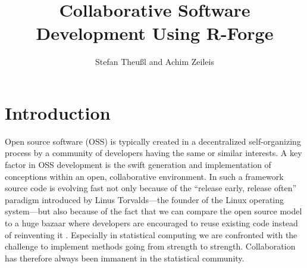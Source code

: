 \title{Collaborative Software Development Using R-Forge}
\author{Stefan Theu\ss{}l and Achim Zeileis}

\maketitle



\newcommand{\tab}[1]{{\normalfont\textit{#1}}}

\section*{Introduction}


Open source software (OSS) is typically created in a decentralized
self-organizing process by a community of developers having the same
or similar interests. A key factor in OSS development is the swift
generation and implementation of conceptions within an open,
collaborative environment. In such a framework source code is evolving
fast not only because of the ``release early, release often''
paradigm introduced by Linus Torvalds---the founder of the Linux
operating system---but also because of the fact that we can compare
the open source model 
to a huge bazaar where developers are encouraged to reuse existing
code instead of reinventing it \citep[see the famous essay
by][]{forge:Raymond:1999}. Especially in statistical computing we are
confronted with the challenge to implement methods going from strength
to strength. Collaboration has therefore always been immanent in the
statistical community. 

